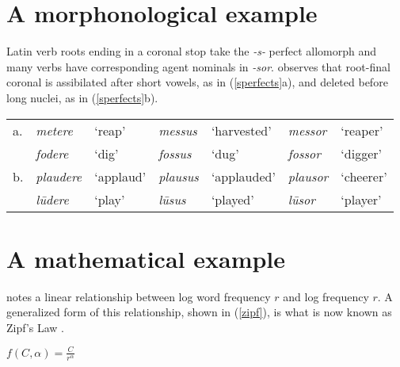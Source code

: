 \documentclass[draft,12pt]{article}
\begin{document}
\section{A morphonological example}

Latin verb roots ending in a coronal stop take the \emph{-s-} perfect allomorph and many verbs have corresponding agent nominals in \emph{-sor}. \citet{Heslin1987} observes that root-final coronal is assibilated after short vowels, as in (\ref{sperfects}a), and deleted before long nuclei, as in (\ref{sperfects}b).

\begin{example} \label{sperfects}
\begin{tabular}{l l l l l l l}
a. & \emph{metere}   & `reap'    & \emph{messus}  & `harvested' & \emph{messor}  & `reaper'   \\
   & \emph{fodere}   & `dig'     & \emph{fossus}  & `dug'       & \emph{fossor}  & `digger'   \\
b. & \emph{plaudere} & `applaud' & \emph{plausus} & `applauded' & \emph{plausor} & `cheerer'  \\
   & \emph{lūdere}   & `play'    & \emph{lūsus}   & `played'    & \emph{lūsor}   & `player' \\
\end{tabular}
\end{example}

\section{A mathematical example}

\citet{Zipf1949} notes a linear relationship between log word frequency $r$ and log frequency $r$. A generalized form of this relationship, shown in (\ref{zipf}), is what is now known as Zipf's Law \citep[e.g.,][]{Baroni2009}.

\begin{unlabeledexample} \label{zipf}
$\displaystyle f(C, \alpha) = \frac{C}{r^\alpha}$
\end{unlabeledexample}



\end{document}
